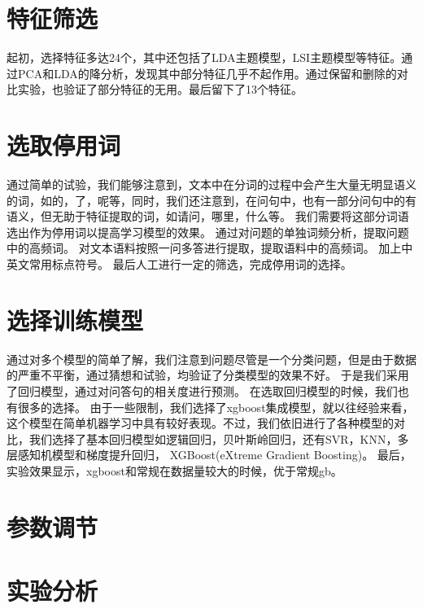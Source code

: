 \documentclass[a4paper,12pt]{report}
\begin{document}
\begin{spacing}{1.5}
\section{特征筛选}
	起初，选择特征多达24个，其中还包括了LDA主题模型，LSI主题模型等特征。通过PCA和LDA的降分析，发现其中部分特征几乎不起作用。通过保留和删除的对比实验，也验证了部分特征的无用。最后留下了13个特征。

\section{选取停用词}
	通过简单的试验，我们能够注意到，文本中在分词的过程中会产生大量无明显语义的词，如的，了，呢等，同时，我们还注意到，在问句中，也有一部分问句中的有语义，但无助于特征提取的词，如请问，哪里，什么等。
	我们需要将这部分词语选出作为停用词以提高学习模型的效果。
	通过对问题的单独词频分析，提取问题中的高频词。
	对文本语料按照一问多答进行提取，提取语料中的高频词。
	加上中英文常用标点符号。
	最后人工进行一定的筛选，完成停用词的选择。
\section{选择训练模型}	
    通过对多个模型的简单了解，我们注意到问题尽管是一个分类问题，但是由于数据的严重不平衡，通过猜想和试验，均验证了分类模型的效果不好。
	于是我们采用了回归模型，通过对问答句的相关度进行预测。
	在选取回归模型的时候，我们也有很多的选择。
	由于一些限制，我们选择了xgboost集成模型，就以往经验来看，这个模型在简单机器学习中具有较好表现。不过，我们依旧进行了各种模型的对比，我们选择了基本回归模型如逻辑回归，贝叶斯岭回归，还有SVR，KNN，多层感知机模型和梯度提升回归， XGBoost(eXtreme Gradient Boosting)。
	最后，实验效果显示，xgboost和常规在数据量较大的时候，优于常规gb。



\section{参数调节}

\section{实验分析}

\end{spacing}

\end{document}
